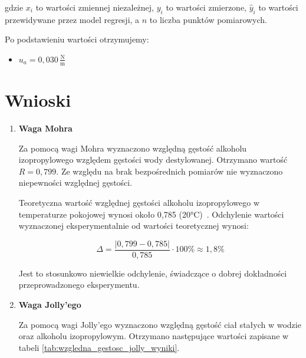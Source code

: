 \documentclass[a4paper,12pt]{article}
\begin{document}
gdzie $x_i$ to wartości zmiennej niezależnej, $y_i$ to wartości zmierzone, $\hat{y}_i$ to wartości przewidywane przez model regresji, a $n$ to liczba punktów pomiarowych.

Po podstawieniu wartości otrzymujemy:

\begin{itemize}
    \item $u_a = 0{,}030\,\frac{\text{N}}{\text{m}}$
\end{itemize}

\section{Wnioski}

\begin{enumerate}
    \item{\textbf{Waga Mohra}}

          Za pomocą wagi Mohra wyznaczono względną gęstość alkoholu izopropylowego względem gęstości wody destylowanej. Otrzymano wartość $R = 0{,}799$. Ze względu na brak bezpośrednich pomiarów nie wyznaczono niepewności względnej gęstości.

          Teoretyczna wartość względnej gęstości alkoholu izopropylowego w temperaturze pokojowej wynosi około 0{,}785 (20°C)~\cite{isopropanol_density}. Odchylenie wartości wyznaczonej eksperymentalnie od wartości teoretycznej wynosi:

          \begin{equation*}
              \Delta = \frac{|0{,}799 - 0{,}785|}{0{,}785} \cdot 100\% \approx 1{,}8\%
          \end{equation*}

          Jest to stosunkowo niewielkie odchylenie, świadczące o dobrej dokładności przeprowadzonego eksperymentu.

    \item{\textbf{Waga Jolly'ego}}

          Za pomocą wagi Jolly'ego wyznaczono względną gęstość ciał stałych w wodzie oraz alkoholu izopropylowym. Otrzymano następujące wartości zapisane w tabeli \ref{tab:wzgledna_gestosc_jolly_wyniki}.


\end{enumerate}
\end{document}

